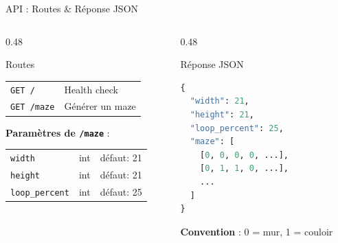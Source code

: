\documentclass[aspectratio=169, 12pt]{beamer}
\begin{document}
\begin{frame}[fragile]{API : Routes \& Réponse JSON}

\begin{columns}[T]
\begin{column}{0.48\textwidth}
\begin{block}{\small Routes}
\small
\begin{tabular}{ll}
\texttt{GET /} & Health check \\
\texttt{GET /maze} & Générer un maze \\
\end{tabular}

\vspace{0.3cm}
\textbf{Paramètres de \texttt{/maze}} :
\begin{tabular}{lll}
\texttt{width} & int & défaut: 21 \\
\texttt{height} & int & défaut: 21 \\
\texttt{loop\_percent} & int & défaut: 25 \\
\end{tabular}
\end{block}
\end{column}

\begin{column}{0.48\textwidth}
\begin{block}{\small Réponse JSON}
\begin{lstlisting}[language=Python]
{
  "width": 21,
  "height": 21,
  "loop_percent": 25,
  "maze": [
    [0, 0, 0, 0, ...],
    [0, 1, 1, 0, ...],
    ...
  ]
}
\end{lstlisting}
\end{block}
\small \textbf{Convention} : 0 = mur, 1 = couloir
\end{column}
\end{columns}

\end{frame}
\end{document}
